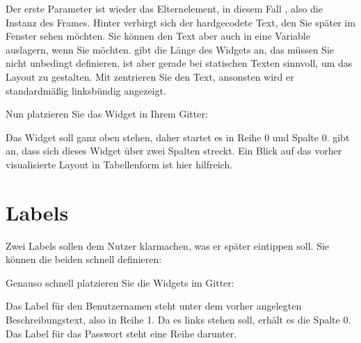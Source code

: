 \medskip


\medskip

Der erste Parameter ist wieder das Elternelement, in diesem Fall , also die Instanz des Frames. Hinter  verbirgt sich der hardgecodete Text, den Sie später im Fenster sehen möchten. Sie können den Text aber auch in eine Variable auslagern, wenn Sie möchten.  gibt die Länge des Widgets an, das müssen Sie nicht unbedingt definieren, ist aber gerade bei statischen Texten sinnvoll, um das Layout zu gestalten. Mit  zentrieren Sie den Text, ansonsten wird er standardmäßig linksbündig angezeigt.

Nun platzieren Sie das Widget in Ihrem Gitter:

\medskip


\medskip


Das Widget soll ganz oben stehen, daher startet es in Reihe 0 und Spalte 0.  gibt an, dass sich dieses Widget über zwei Spalten streckt. Ein Blick auf das vorher visualisierte Layout in Tabellenform ist hier hilfreich.

\section{Labels}

Zwei Labels sollen dem Nutzer klarmachen, was er später eintippen soll. Sie können die beiden schnell definieren:

\medskip



\medskip

Genauso schnell platzieren Sie die Widgets im Gitter:

\medskip



\medskip

Das Label für den Benutzernamen steht unter dem vorher angelegten Beschreibungstext, also in Reihe 1. Da es links stehen soll, erhält es die Spalte 0. Das Label für das Passwort steht eine Reihe darunter.

